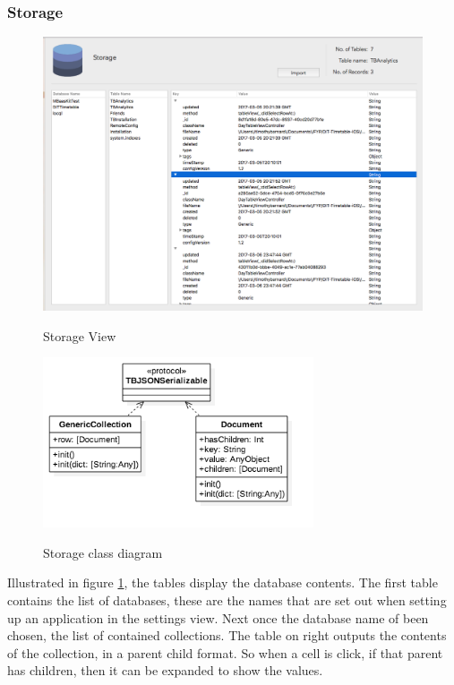 \subsubsection{Storage}

\begin{figure}[!h]
    \caption{Storage View}
    \centering
    \includegraphics[width=120mm]{images/dashboard/storage}
    \label{fig:storage}
\end{figure}

\begin{figure}[!h]
    \caption{Storage class diagram}
    \centering
    \includegraphics[width=80mm]{images/classdiagrams/storage_class}
    \label{fig:storage_class}
\end{figure} 

Illustrated in figure \ref{fig:storage}, the tables display the database contents. The first table contains the list of databases, these are the names that are set out when setting up an application in the settings view. Next once the database name of been chosen, the list of contained collections. The table on right outputs the contents of the collection, in a parent child format. So when a cell is click, if that parent has children, then it can be expanded to show the values.

